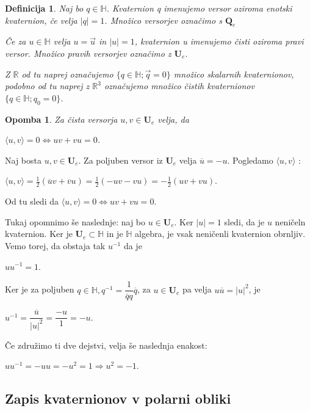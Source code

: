 \documentclass[a4paper,12pt]{article}
\def\R{\mathbb{R}} %
\def\H{\mathbb{H}} %
\def\Qe{\textbf{Q}_{e}} %
\def\Ue{\textbf{U}_{e}} %
\newcommand{\dotpr}[2]{\langle #1, #2 \rangle}
\newtheorem{opomba}{Opomba}
\newtheorem{definicija}{Definicija}
\begin{document}
\begin{definicija}
   Naj bo $q \in \H$. Kvaternion q imenujemo \emph{versor} oziroma \emph{enotski kvaternion}, če velja
   $|q| = 1$. Množico versorjev označimo s $\Qe$

   Če za $u \in \H $ velja $u = \vec{u}$ in $|u| = 1$, kvaternion u imenujemo \emph{čisti} oziroma \emph{pravi} versor.
   Množico pravih versorjev označimo z $\Ue$.

   Z $\R$ od tu naprej označujemo $\{ q \in \H; \vec{q} = 0 \}$ množico skalarnih kvaternionov, podobno od tu naprej z $\R^3$ označujemo
   množico čistih kvaternionov $\{q \in \H; q_{0} = 0 \}$. \emph{~\cite{weiner2005quaternions}}
\end{definicija}
\begin{opomba}
   Za čista versorja $u, v \in \Ue$ velja, da 
   \begin{center}
      $\dotpr{u}{v} = 0 \iff uv + vu = 0$.
   \end{center}
\end{opomba}
Naj bosta $u, v \in \Ue$. Za poljuben versor iz $\Ue$ velja $\overline{u} = -u$. Pogledamo $\dotpr{u}{v}$ :
\begin{center}
   $\dotpr{u}{v} = \frac{1}{2}(\overline{u}v + \overline{v}u) = \frac{1}{2}(-uv -vu) = -\frac{1}{2}(uv + vu)$.
\end{center}
Od tu sledi da $\dotpr{u}{v} = 0 \iff uv + vu = 0$.

Tukaj opomnimo še naslednje: naj bo $u \in \Ue$. Ker $|u| = 1$ sledi, da je $u$ neničeln kvaternion.
Ker je $\Ue \subset \H$ in je $\H$ algebra, je vsak neničenli kvaternion obrnljiv. Vemo torej, da obstaja tak $u^{-1}$ da je
\begin{center}
   $uu^{-1} = 1$.
\end{center}
Ker je za poljuben $q \in \H, q^{-1} = \dfrac{1}{\overline{q}q} \overline{q}$, za $u \in \Ue$ pa velja $u\overline{u} = |u|^2$, je 
\begin{center}
   $u^{-1} = \dfrac{\overline{u}}{|u|^2} = \dfrac{-u}{1} = -u$.
\end{center}
Če združimo ti dve dejstvi, velja še naslednja enakost:
\begin{center}
   $uu^{-1} = -uu = -u^2 = 1 \Rightarrow u^2 = -1$.
\end{center}

\subsection{Zapis  kvaternionov v polarni obliki}
\end{document}
